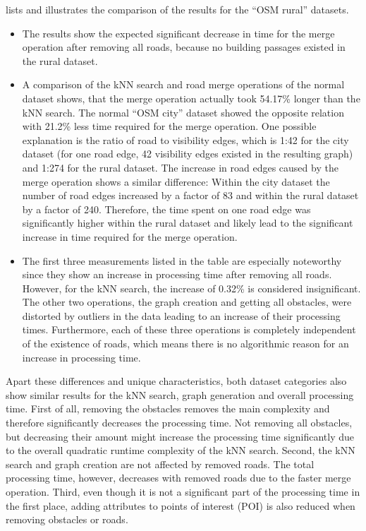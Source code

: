 			 lists and illustrates the comparison of the results for the \enquote{OSM rural} datasets.
			\begin{itemize}
				\item The results show the expected significant decrease in time for the merge operation after removing all roads, because no building passages existed in the rural dataset.
				\item A comparison of the kNN search and road merge operations of the normal dataset shows, that the merge operation actually took 54.17\% longer than the kNN search.
				The normal \enquote{OSM city} dataset showed the opposite relation with 21.2\% less time required for the merge operation.
				One possible explanation is the ratio of road to visibility edges, which is 1:42 for the city dataset (for one road edge, 42 visibility edges existed in the resulting graph) and 1:274 for the rural dataset.
				The increase in road edges caused by the merge operation shows a similar difference:
				Within the city dataset the number of road edges increased by a factor of 83 and within the rural dataset by a factor of 240.
				Therefore, the time spent on one road edge was significantly higher within the rural dataset and likely lead to the significant increase in time required for the merge operation.
				\item The first three measurements listed in the table are especially noteworthy since they show an increase in processing time after removing all roads.
				However, for the kNN search, the increase of 0.32\% is considered insignificant.
				The other two operations, the graph creation and getting all obstacles, were distorted by outliers in the data leading to an increase of their processing times.
				Furthermore, each of these three operations is completely independent of the existence of roads, which means there is no algorithmic reason for an increase in processing time.
			\end{itemize}
			Apart these differences and unique characteristics, both dataset categories also show similar results for the kNN search, graph generation and overall processing time.
			First of all, removing the obstacles removes the main complexity and therefore significantly decreases the processing time.
			Not removing all obstacles, but decreasing their amount might increase the processing time significantly due to the overall quadratic runtime complexity of the kNN search.
			Second, the kNN search and graph creation are not affected by removed roads.
			The total processing time, however, decreases with removed roads due to the faster merge operation.
			Third, even though it is not a significant part of the processing time in the first place, adding attributes to points of interest (POI) is also reduced when removing obstacles or roads.
	
